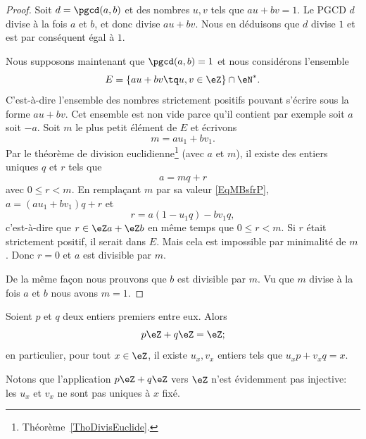 \begin{proof}
    Soit \( d=\pgcd(a,b)\) et des nombres \( u,v\) tels que \( au+bv=1\). Le PGCD \( d\) divise à la fois \( a\) et \( b\), et donc divise \( au+bv\). Nous en déduisons que \( d\) divise \( 1\) et est par conséquent égal à \( 1\).

    Nous supposons maintenant que \( \pgcd(a,b)=1\) et nous considérons l'ensemble
    \begin{equation}
        E=\{ au+bv\tq u,v\in \eZ \}\cap \eN^*.
    \end{equation}
    C'est-à-dire l'ensemble des nombres strictement positifs pouvant s'écrire sous la forme \( au+bv\). Cet ensemble est non vide parce qu'il contient par exemple soit \( a\) soit \( -a\). Soit \( m\) le plus petit élément de \( E\) et écrivons
    \begin{equation}    \label{EqMBsfrP}
        m=au_1+bv_1.
    \end{equation}
    Par le théorème de division euclidienne\footnote{Théorème~\ref{ThoDivisEuclide}.} (avec \( a\) et \( m\)), il existe des entiers uniques $q$ et $r$ tels que
    \begin{equation}
        a=mq+r
    \end{equation}
    avec \( 0\leq r<m\). En remplaçant \( m\) par sa valeur \eqref{EqMBsfrP}, \( a=(au_1+bv_1)q+r\) et
    \begin{equation}
        r=a(1-u_1q)-bv_1q,
    \end{equation}
    c'est-à-dire que \( r\in \eZ a+\eZ b\) en même temps que \( 0\leq r<m\). Si \( r\) était strictement positif, il serait dans \( E\). Mais cela est impossible par minimalité de \( m\). Donc \( r=0\) et \( a\) est divisible par \( m\).

    De la même façon nous prouvons que \( b\) est divisible par \( m\). Vu que \( m\) divise à la fois \( a\) et \( b\) nous avons \( m=1\).
\end{proof}

\begin{corollary}       \label{CorgEMtLj}
    Soient \( p\) et \( q\) deux entiers premiers entre eux. Alors
    \begin{equation}
        p\eZ+q\eZ=\eZ;
    \end{equation}
    en particulier, pour tout \( x \in \eZ \), il existe \( u_x, v_x \) entiers tels que \(u_x p + v_x q = x \).
\end{corollary}

Notons que l'application \( p\eZ+q\eZ\) vers \( \eZ\) n'est évidemment pas injective: les $u_x$ et $v_x$ ne sont pas uniques à $x$ fixé.

